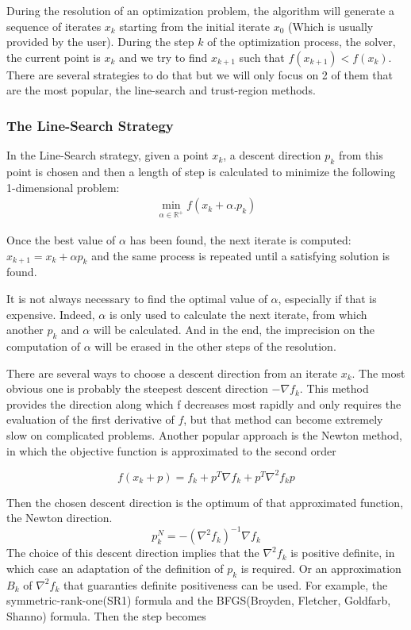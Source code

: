 During the resolution of an optimization problem, the algorithm will generate a
sequence of iterates $x_k$ starting from the initial iterate $x_0$ (Which is
usually provided by the user). During the step $k$ of the optimization process,
the solver, the current point is $x_k$ and we try to find $x_{k+1}$ such that
$f(x_{k+1}) < f(x_k)$. There are several strategies to do that but we will only focus
on 2 of them that are the most popular, the line-search and trust-region
methods.

\subsubsection{The Line-Search Strategy}
In the Line-Search strategy, given a point $x_k$, a descent direction $p_k$ from this
point is chosen and then a length of step is calculated to minimize the
following 1-dimensional problem:
\begin{align}
  \min_{\alpha \in \mathbb{R}^+} f(x_k + \alpha.p_k)
\label{eq:lineSearchNLP}
\end{align}

Once the best value of $\alpha$ has been found, the next iterate is computed:
$x_{k+1} = x_{k} + \alpha p_k$ and the same process is repeated until a
satisfying solution is found.

It is not always necessary to find the optimal value of $\alpha$, especially if
that is expensive. Indeed, $\alpha$ is only used to calculate the next iterate,
from which another $p_k$ and $\alpha$ will be calculated. And in the end, the
imprecision on the computation of $\alpha$ will be erased in the other steps of
the resolution.

There are several ways to choose a descent direction from an iterate $x_k$. The
most obvious one is probably the steepest descent direction $-\nabla f_k$. This
method provides the direction along which f decreases most rapidly and only
requires the evaluation of the first derivative of $f$, but that method can
become extremely slow on complicated problems. Another popular approach is the
Newton method, in which the objective function is approximated to the second
order

\begin{equation}
  f(x_k+p) = f_k + p^T\nabla f_k + p^T\nabla^2f_k p
\end{equation}

Then the chosen descent direction is the optimum of that approximated function,
the Newton direction.
\begin{equation}
  p^N_k = -(\nabla^2 f_k)^{-1} \nabla f_k
\end{equation}
The choice of this descent direction implies that the $\nabla^2f_k$ is positive
definite, in which case an adaptation of the definition of $p_k$ is required. Or
an approximation $B_k$ of $\nabla^2f_k$ that guaranties definite positiveness can be
used. For example, the symmetric-rank-one(SR1) formula and the BFGS(Broyden,
Fletcher, Goldfarb, Shanno) formula. Then the step becomes

